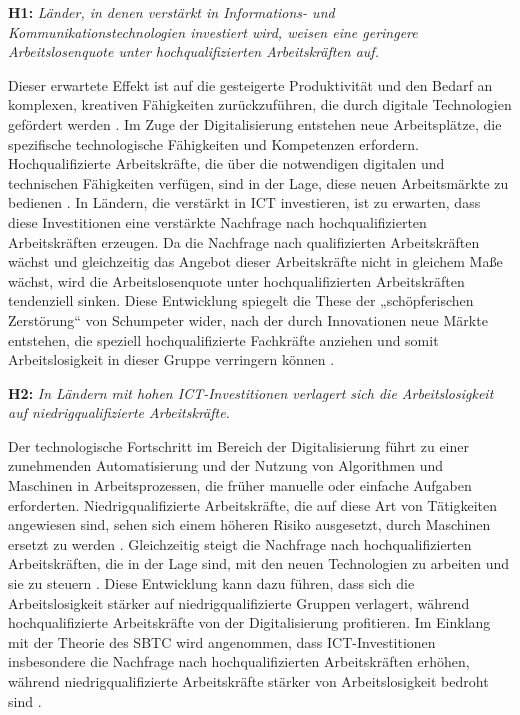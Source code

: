 \textbf{H1:} \textit{Länder, in denen verstärkt in Informations- und Kommunikationstechnologien 
investiert wird, weisen eine geringere Arbeitslosenquote unter hochqualifizierten Arbeitskräften 
auf.}

Dieser erwartete Effekt ist auf die gesteigerte Produktivität und den Bedarf an komplexen, 
kreativen Fähigkeiten zurückzuführen, die durch digitale Technologien gefördert werden 
\parencite[vgl.][S. 1070–1071]{acemoglu2011skills}. Im Zuge der Digitalisierung entstehen neue 
Arbeitsplätze, die spezifische technologische Fähigkeiten und Kompetenzen erfordern. 
Hochqualifizierte Arbeitskräfte, die über die notwendigen digitalen und technischen Fähigkeiten 
verfügen, sind in der Lage, diese neuen Arbeitsmärkte zu bedienen 
\parencite[vgl.][1071]{acemoglu2011skills}. In Ländern, die verstärkt in \ac{ICT} investieren, 
ist zu erwarten, dass diese Investitionen eine verstärkte Nachfrage nach hochqualifizierten 
Arbeitskräften erzeugen. Da die Nachfrage nach qualifizierten Arbeitskräften wächst und 
gleichzeitig das Angebot dieser Arbeitskräfte nicht in gleichem Maße wächst, wird die 
Arbeitslosenquote unter hochqualifizierten Arbeitskräften tendenziell sinken. Diese Entwicklung 
spiegelt die These der „schöpferischen Zerstörung“ von Schumpeter wider, nach der durch 
Innovationen neue Märkte entstehen, die speziell hochqualifizierte Fachkräfte anziehen und somit 
Arbeitslosigkeit in dieser Gruppe verringern können 
\parencite[vgl.][S. 83]{schumpeter1976capitalism}.

\textbf{H2:} \textit{In Ländern mit hohen \ac{ICT}-Investitionen verlagert sich die 
Arbeitslosigkeit auf niedrigqualifizierte Arbeitskräfte.}

Der technologische Fortschritt im Bereich der Digitalisierung führt zu einer zunehmenden 
Automatisierung und der Nutzung von Algorithmen und Maschinen in Arbeitsprozessen, die früher 
manuelle oder einfache Aufgaben erforderten. Niedrigqualifizierte Arbeitskräfte, die auf diese 
Art von Tätigkeiten angewiesen sind, sehen sich einem höheren Risiko ausgesetzt, durch Maschinen 
ersetzt zu werden \parencite[vgl.][S. 9-12]{autor2015whyare}. Gleichzeitig steigt die Nachfrage 
nach hochqualifizierten Arbeitskräften, die in der Lage sind, mit den neuen Technologien zu 
arbeiten und sie zu steuern \parencite[vgl.][S. 12]{autor2015whyare}. Diese Entwicklung kann dazu 
führen, dass sich die Arbeitslosigkeit stärker auf niedrigqualifizierte Gruppen verlagert, 
während hochqualifizierte Arbeitskräfte von der Digitalisierung profitieren. Im Einklang mit der 
Theorie des \ac{SBTC} wird angenommen, dass \ac{ICT}-Investitionen insbesondere die Nachfrage 
nach hochqualifizierten Arbeitskräften erhöhen, während niedrigqualifizierte Arbeitskräfte 
stärker von Arbeitslosigkeit bedroht sind \parencite[vgl.][S. 1070-1072]{acemoglu2011skills}.

